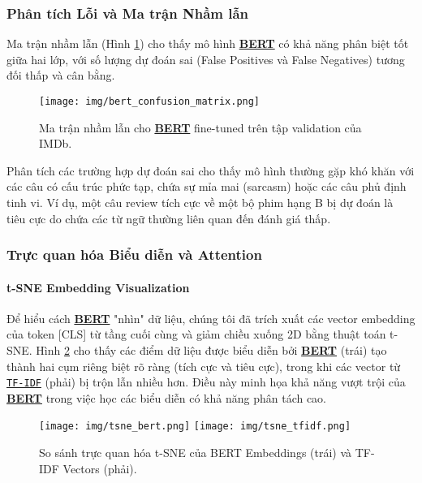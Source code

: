     \subsubsection{Phân tích Lỗi và Ma trận Nhầm lẫn}
    Ma trận nhầm lẫn (Hình \ref{fig:confusion_matrix_app}) cho thấy mô hình \hyperref[acro:bert]{\textbf{BERT}} có khả năng phân biệt tốt giữa hai lớp, với số lượng dự đoán sai (False Positives và False Negatives) tương đối thấp và cân bằng.
    
    \begin{figure}[H]
        \centering
        \texttt{[image: img/bert\_confusion\_matrix.png]}
        \caption{Ma trận nhầm lẫn cho \hyperref[acro:bert]{\textbf{BERT}} fine-tuned trên tập validation của IMDb.}
        \label{fig:confusion_matrix_app}
    \end{figure}
    
    Phân tích các trường hợp dự đoán sai cho thấy mô hình thường gặp khó khăn với các câu có cấu trúc phức tạp, chứa sự mỉa mai (sarcasm) hoặc các câu phủ định tinh vi. Ví dụ, một câu review tích cực về một bộ phim hạng B bị dự đoán là tiêu cực do chứa các từ ngữ thường liên quan đến đánh giá thấp.
    
    \subsubsection{Trực quan hóa Biểu diễn và Attention}
    \paragraph{t-SNE Embedding Visualization}
    Để hiểu cách \hyperref[acro:bert]{\textbf{BERT}} "nhìn" dữ liệu, chúng tôi đã trích xuất các vector embedding của token [CLS] từ tầng cuối cùng và giảm chiều xuống 2D bằng thuật toán t-SNE. Hình \ref{fig:tsne_comparison_app} cho thấy các điểm dữ liệu được biểu diễn bởi \hyperref[acro:bert]{\textbf{BERT}} (trái) tạo thành hai cụm riêng biệt rõ ràng (tích cực và tiêu cực), trong khi các vector từ \hyperref[acro:tfidf]{\texttt{TF-IDF}} (phải) bị trộn lẫn nhiều hơn. Điều này minh họa khả năng vượt trội của \hyperref[acro:bert]{\textbf{BERT}} trong việc học các biểu diễn có khả năng phân tách cao.
    
    \begin{figure}[H]
        \centering
        \texttt{[image: img/tsne\_bert.png]}
        \texttt{[image: img/tsne\_tfidf.png]}
        \caption{So sánh trực quan hóa t-SNE của BERT Embeddings (trái) và TF-IDF Vectors (phải).}
        \label{fig:tsne_comparison_app}
    \end{figure}
    
